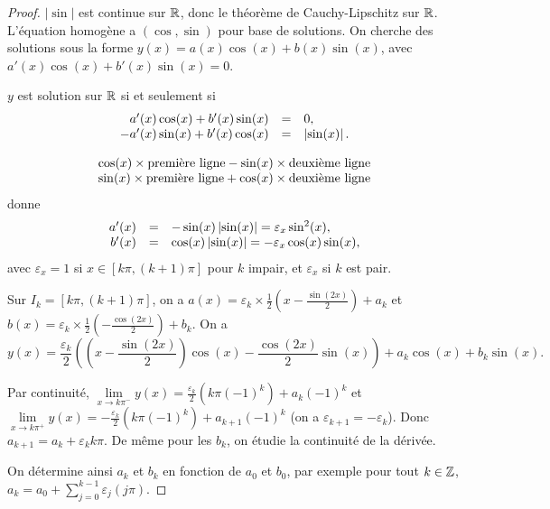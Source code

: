 \documentclass[12pt]{article}
\begin{document}
\begin{proof}
	$\left\lvert\sin\right\rvert$ est continue sur $\mathbb{R}$, donc le théorème de Cauchy-Lipschitz sur $\mathbb{R}$. L'équation homogène a $(\cos,\sin)$ pour base de solutions. On cherche des solutions sous la forme $y(x)=a(x)\cos(x)+b(x)\sin(x)$, avec $a'(x)\cos(x)+b'(x)\sin(x)=0$.

	$y$ est solution sur $\mathbb{R}$ si et seulement si 
	\begin{equation}
		\begin{array}[]{rcl}
			a'(x)\cos(x)+b'(x)\sin(x)&=&0,\\
			-a'(x)\sin(x)+b'(x)\cos(x)&=&\left\lvert\sin(x)\right\rvert.
		\end{array}
	\end{equation}
	
	
	\begin{equation}
		\begin{array}[]{l}
			\cos(x)\times\text{première ligne}-\sin(x)\times\text{deuxième ligne}\\
			\sin(x)\times\text{première ligne}+\cos(x)\times\text{deuxième ligne}
		\end{array}
	\end{equation}
	donne 
	\begin{equation}
		\begin{array}[]{rcl}
			a'(x) &=& -\sin(x)\left\lvert\sin(x)\right\rvert=\varepsilon_{x}\sin^{2}(x),\\
			b'(x) &=& \cos(x)\left\lvert\sin(x)\right\rvert=-\varepsilon_{x}\cos(x)\sin(x),
		\end{array}
	\end{equation}
	avec $\varepsilon_{x}=1$ si $x\in[k\pi,(k+1)\pi]$ pour $k$ impair, et $\varepsilon_{x}$ si $k$ est pair.

	Sur $I_k=[k\pi,(k+1)\pi]$, on a $a(x)=\varepsilon_k\times\frac{1}{2}\left(x-\frac{\sin(2x)}{2}\right)+a_k$ et $b(x)=\varepsilon_{k}\times\frac{1}{2}\left(-\frac{\cos(2x)}{2}\right)+b_k$. On a 
	\begin{equation}
		y(x)=\frac{\varepsilon_k}{2}\left(\left(x-\frac{\sin(2x)}{2}\right)\cos(x)-\frac{\cos(2x)}{2}\sin(x)\right)+a_k\cos(x)+b_k\sin(x).
	\end{equation}

	Par continuité, $\lim\limits_{x\to k\pi^{-}}y(x)=\frac{\varepsilon_{k}}{2}\left(k\pi(-1)^{k}\right)+a_k(-1)^{k}$ et $\lim\limits_{x\to k\pi^{+}}y(x)=-\frac{\varepsilon_k}{2}(k\pi(-1)^{k})+a_{k+1}(-1)^{k}$ (on a $\varepsilon_{k+1}=-\varepsilon_k$). Donc $a_{k+1}=a_{k}+\varepsilon_{k}k\pi$. De même pour les $b_k$, on étudie la continuité de la dérivée.

	On détermine ainsi $a_k$ et $b_k$ en fonction de $a_0$ et $b_0$, par exemple pour tout $k\in\mathbb{Z}$, $a_k=a_0+\sum_{j=0}^{k-1}\varepsilon_j	(j\pi)$.
\end{proof}
\end{document}
